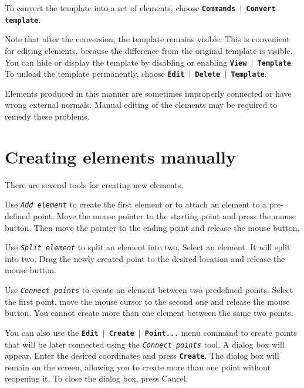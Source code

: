 \documentclass[12pt]{report}
\begin{document}
To convert the template into a set of elements, choose
\textbf{\texttt{Commands \begin{math}\vert{}\end{math} Convert
template}}.

Note that after the conversion, the template remains visible. This is
convenient for editing elements, because the difference from the
original template is visible. You can hide or display the template by
disabling or enabling
\textbf{\texttt{View \begin{math}\vert{}\end{math} Template}}. To unload
the template permanently, choose
\textbf{\texttt{Edit \begin{math}\vert{}\end{math} Delete \begin{math}\vert{}\end{math} Template}}.

Elements produced in this manner are sometimes improperly connected or
have wrong external normals. Manual editing of the elements may be required to 
remedy these problems. 

\section{Creating elements manually}

There are several tools for creating new elements.

Use \textit{\texttt{Add element}} to create the first element or to
attach an element to a pre-defined point. Move the mouse pointer to the
starting point and press the mouse button. Then move the pointer to the
ending point and release the mouse button.

Use \textit{\texttt{Split element}} to split an element into two.
Select an element. It will split into two. Drag the newly created point
to the desired location and release the mouse button.

Use \textit{\texttt{Connect points}} to create an element between two
predefined points. Select the first point, move the mouse cursor to
the second one and release the mouse button. You cannot create more
than one element between the same two points.

You can also use the
\textbf{\texttt{Edit  \begin{math}\vert{}\end{math}  Create \begin{math}\vert{}\end{math}  Point...}}
menu command to create points that will be later connected using the
\textit{\texttt{Connect points}} tool. A dialog box will appear. Enter
the desired coordinates and press \textbf{\texttt{Create}}. The dialog
box will remain on the screen, allowing you to create more than one
point without reopening it. To close the dialog box, press Cancel.
\end{document}
